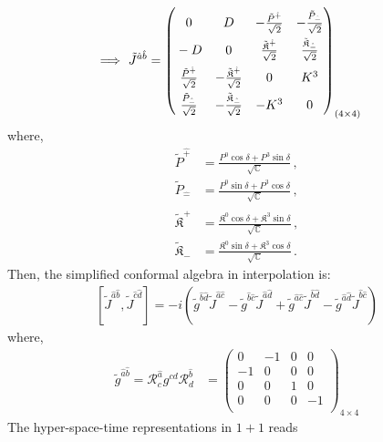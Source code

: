 \documentclass[]{article}
\numberwithin{equation}{section}
\begin{document}
{{\begin{align}
   \Longrightarrow~\tilde{J}^{{\hat{a}}{\hat{b}}}&=\begin{pmatrix}
    \rule{0pt}{16pt} 0&D&-\frac{\tilde{P}^{\hat{+}}}{\sqrt{2}}&-\frac{\tilde{P}_{\hat{-}}}{\sqrt{2}}\\
    \rule{0pt}{16pt} -D&0&\frac{\tilde{\mathfrak{K}}^{\hat{+}}}{\sqrt{2}}&\frac{\tilde{\mathfrak{K}}_{\hat{-}}}{\sqrt{2}}\\
    \rule{0pt}{16pt} \frac{\tilde{P}^{\hat{+}}}{\sqrt{2}}&-\frac{\tilde{\mathfrak{K}}^{\hat{+}}}{\sqrt{2}}&0  & K^{3}\\
    \rule{0pt}{16pt}\frac{\tilde{P}_{\hat{-}}}{\sqrt{2}}&- \frac{\tilde{\mathfrak{K}}_{\hat{-}}}{\sqrt{2}}&-K^{3} & 0
  \end{pmatrix}_{(4\times4)}
\end{align}
where, 
\begin{align}
    \tilde{P}^{\hat{+}}&=\frac{P^0\cos{\delta}+P^3\sin{\delta}}{\sqrt{\mathbb{C}}}\,,\\
    \tilde{P}_{\hat{-}}&=\frac{P^0\sin{\delta}+P^3\cos{\delta}}{\sqrt{\mathbb{C}}}\,,\\
    \tilde{\mathfrak{K}}^{\hat{+}}&=\frac{\mathfrak{K}^0\cos{\delta}+\mathfrak{K}^3\sin{\delta}}{\sqrt{\mathbb{C}}}\,,\\
    \tilde{\mathfrak{K}}_{\hat{-}}&=\frac{\mathfrak{K}^0\sin{\delta}+\mathfrak{K}^3\cos{\delta}}{\sqrt{\mathbb{C}}}\,.
\end{align}
Then, the simplified conformal algebra in interpolation is:
  \begin{align}
      \left[\tilde{J}^{{\hat{a}}{\hat{b}}},\tilde{J}^{{\hat{c}}{\hat{d}}}\right]=-i\left(\tilde{g}^{{\hat{b}}{\hat{d}}}\tilde{J}^{{\hat{a}}{\hat{c}}}-\tilde{g}^{{\hat{b}}{\hat{c}}}\tilde{J}^{{\hat{a}}{\hat{d}}}+\tilde{g}^{{\hat{a}}{\hat{c}}}\tilde{J}^{{\hat{b}}{\hat{d}}}-\tilde{g}^{{\hat{a}}{\hat{d}}}\tilde{J}^{{\hat{b}}{\hat{c}}}\right)\label{simplesrint}
  \end{align}
where, 
\begin{align}
    \tilde{g}^{\hat{a}\hat{b}}=\mathcal{R}^{\hat{a}}_{{c}}g^{cd}\mathcal{R}^{\hat{b}}_{{d}}&=\begin{pmatrix}
  0&-1&0&0\\
  -1&0&0&0\\
  0&0&1&0\\
  0&0&0&-1\\
  \end{pmatrix}_{4\times4}
\end{align}
The hyper-space-time representations in $1+1$ reads
\begin{align}

\end{align}}}
\end{document}
